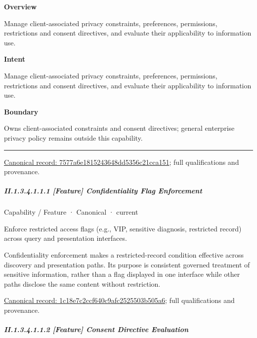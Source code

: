 \textbf{Overview}



Manage client-associated privacy constraints, preferences, permissions, restrictions and consent directives, and evaluate their applicability to information use.



\textbf{Intent}



Manage client-associated privacy constraints, preferences, permissions, restrictions and consent directives, and evaluate their applicability to information use.



\textbf{Boundary}



Owns client-associated constraints and consent directives; general enterprise privacy policy remains outside this capability.



\medskip\hrule\medskip

{\footnotesize \href{../../../../continuum/strategy/capability/7577a6e1815243648dd5356c21cca151.md}{Canonical record: 7577a6e1815243648dd5356c21cca151}; full qualifications and provenance.}\par
\subparagraph*{II.1.3.4.1.1.1 [Feature] Confidentiality Flag Enforcement}
\label{navigation:II.1.3.4.1.1.1}

\label{element:1c18e7c2ccf640c9afc2525503b505a6}
{\small Capability / Feature · Canonical · current}\par

Enforce restricted access flags (e.g., VIP, sensitive diagnosis, restricted record) across query and presentation interfaces.



Confidentiality enforcement makes a restricted-record condition effective across discovery and presentation paths. Its purpose is consistent governed treatment of sensitive information, rather than a flag displayed in one interface while other paths disclose the same content without restriction.


{\footnotesize \href{../../../../continuum/strategy/capability/feature/1c18e7c2ccf640c9afc2525503b505a6.md}{Canonical record: 1c18e7c2ccf640c9afc2525503b505a6}; full qualifications and provenance.}\par
\subparagraph*{II.1.3.4.1.1.2 [Feature] Consent Directive Evaluation}
\label{navigation:II.1.3.4.1.1.2}

